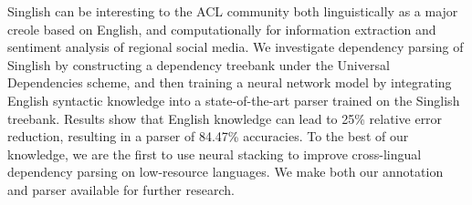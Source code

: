 Singlish can be interesting to the ACL community both linguistically as a major creole based on English, and computationally for information extraction and sentiment analysis of regional social media. We investigate dependency parsing of Singlish by constructing a dependency treebank under the Universal Dependencies scheme, and then training a neural network model by integrating English syntactic knowledge into a state-of-the-art parser trained on the Singlish treebank. Results show that English knowledge can lead to 25\% relative error reduction, resulting in a parser of 84.47\% accuracies. To the best of our knowledge, we are the first to use neural stacking to improve cross-lingual dependency parsing on low-resource languages. We make both our annotation and parser available for further research.
